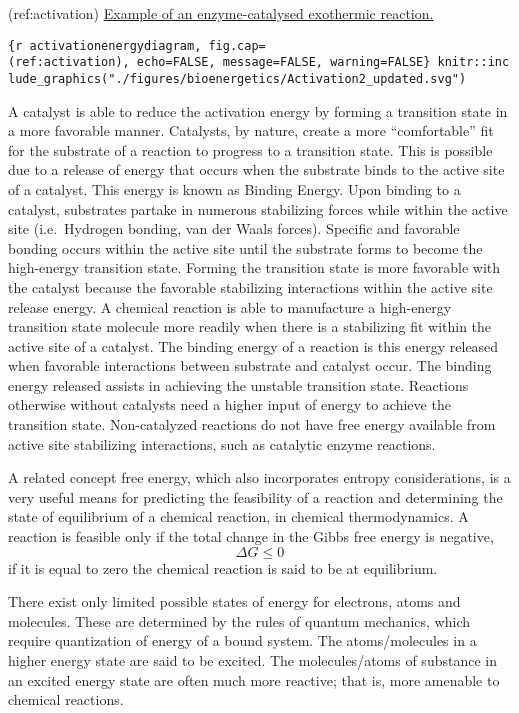 \documentclass[
]{article}
\begin{document}
(ref:activation)
\href{https://commons.wikimedia.org/wiki/File:Activation2_updated.svg}{Example
of an enzyme-catalysed exothermic reaction.}

\texttt{\{r\ activationenergydiagram,\ fig.cap=\textquotesingle{}(ref:activation)\textquotesingle{},\ echo=FALSE,\ message=FALSE,\ warning=FALSE\}\ knitr::include\_graphics("./figures/bioenergetics/Activation2\_updated.svg")}

A catalyst is able to reduce the activation energy by forming a
transition state in a more favorable manner. Catalysts, by nature,
create a more ``comfortable'' fit for the substrate of a reaction to
progress to a transition state. This is possible due to a release of
energy that occurs when the substrate binds to the active site of a
catalyst. This energy is known as Binding Energy. Upon binding to a
catalyst, substrates partake in numerous stabilizing forces while within
the active site (i.e.~Hydrogen bonding, van der Waals forces). Specific
and favorable bonding occurs within the active site until the substrate
forms to become the high-energy transition state. Forming the transition
state is more favorable with the catalyst because the favorable
stabilizing interactions within the active site release energy. A
chemical reaction is able to manufacture a high-energy transition state
molecule more readily when there is a stabilizing fit within the active
site of a catalyst. The binding energy of a reaction is this energy
released when favorable interactions between substrate and catalyst
occur. The binding energy released assists in achieving the unstable
transition state. Reactions otherwise without catalysts need a higher
input of energy to achieve the transition state. Non-catalyzed reactions
do not have free energy available from active site stabilizing
interactions, such as catalytic enzyme reactions.

A related concept free energy, which also incorporates entropy
considerations, is a very useful means for predicting the feasibility of
a reaction and determining the state of equilibrium of a chemical
reaction, in chemical thermodynamics. A reaction is feasible only if the
total change in the Gibbs free energy is negative, \[ \Delta G \leq 0 \]
if it is equal to zero the chemical reaction is said to be at
equilibrium.

There exist only limited possible states of energy for electrons, atoms
and molecules. These are determined by the rules of quantum mechanics,
which require quantization of energy of a bound system. The
atoms/molecules in a higher energy state are said to be excited. The
molecules/atoms of substance in an excited energy state are often much
more reactive; that is, more amenable to chemical reactions.
\end{document}
